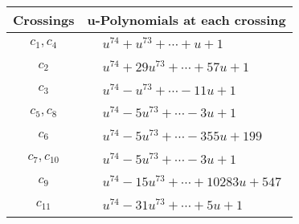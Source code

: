 \documentclass[1p]{elsarticle_modified}
\theoremstyle{definition}
\begin{document}
\begin{tabular}{m{50pt}|m{274pt}}
Crossings & \hspace{64pt}u-Polynomials at each crossing \\
\hline $$\begin{aligned}c_{1},c_{4}\end{aligned}$$&$\begin{aligned}
&u^{74}+u^{73}+\cdots+u+1
\end{aligned}$\\
\hline $$\begin{aligned}c_{2}\end{aligned}$$&$\begin{aligned}
&u^{74}+29 u^{73}+\cdots+57 u+1
\end{aligned}$\\
\hline $$\begin{aligned}c_{3}\end{aligned}$$&$\begin{aligned}
&u^{74}- u^{73}+\cdots-11 u+1
\end{aligned}$\\
\hline $$\begin{aligned}c_{5},c_{8}\end{aligned}$$&$\begin{aligned}
&u^{74}-5 u^{73}+\cdots-3 u+1
\end{aligned}$\\
\hline $$\begin{aligned}c_{6}\end{aligned}$$&$\begin{aligned}
&u^{74}-5 u^{73}+\cdots-355 u+199
\end{aligned}$\\
\hline $$\begin{aligned}c_{7},c_{10}\end{aligned}$$&$\begin{aligned}
&u^{74}-5 u^{73}+\cdots-3 u+1
\end{aligned}$\\
\hline $$\begin{aligned}c_{9}\end{aligned}$$&$\begin{aligned}
&u^{74}-15 u^{73}+\cdots+10283 u+547
\end{aligned}$\\
\hline $$\begin{aligned}c_{11}\end{aligned}$$&$\begin{aligned}
&u^{74}-31 u^{73}+\cdots+5 u+1
\end{aligned}$\\
\hline
\end{tabular}\\~\\
\end{document}

